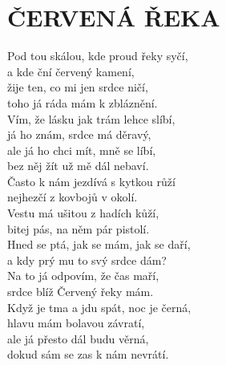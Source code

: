 \section*{\Huge ČERVENÁ ŘEKA}

Pod tou skálou, kde proud řeky syčí,\\
a kde ční červený kamení,\hspace{0,5cm} \\
žije ten, co mi jen srdce ničí,\\
toho já ráda mám k zbláznění.\\

Vím, že lásku jak trám lehce slíbí,\\
já ho znám, srdce má děravý,\\
ale já ho chci mít, mně se líbí,\\
bez něj žít už mě dál nebaví.\\

Často k nám jezdívá s kytkou růží\\
nejhezčí z kovbojů v okolí.\\
Vestu má ušitou z hadích kůží,\\
bitej pás, na něm pár pistolí.\\

Hned se ptá, jak se mám, jak se daří,\\
a kdy prý mu to svý srdce dám?\\
Na to já odpovím, že čas maří,\\
srdce blíž Červený řeky mám.\\

Když je tma a jdu spát, noc je černá,\\
hlavu mám bolavou závratí,\\
ale já přesto dál budu věrná,\\
dokud sám se zas k nám nevrátí.

\newpage
